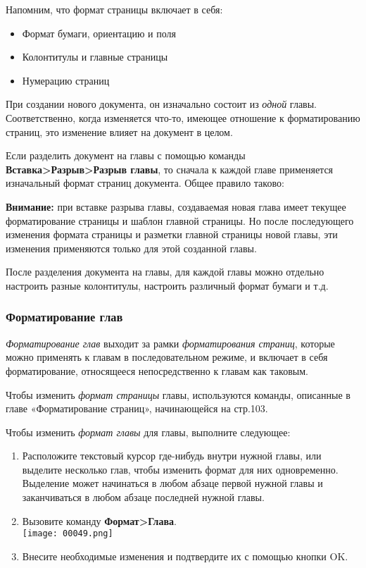 \documentclass[a4paper,10pt]{article}
\begin{document}
Напомним, что формат страницы включает в себя:
\begin{itemize}
 \item Формат бумаги, ориентацию и поля
 \item Колонтитулы и главные страницы
 \item Нумерацию страниц
\end{itemize}

При создании нового документа, он изначально состоит из \textit{одной} главы. Соответственно, когда изменяется что-то, имеющее отношение к форматированию страниц, это изменение влияет на документ в целом.

Если разделить документ на главы с помощью команды \textbf{Вставка>Разрыв>Разрыв главы}, то сначала к каждой главе применяется изначальный формат страниц документа. Общее правило таково:

\begin{mdframed}[backgroundcolor=blue!10]
\textbf{Внимание:} при вставке разрыва главы, создаваемая новая глава имеет текущее форматирование страницы и шаблон главной страницы. Но после последующего изменения формата страницы и разметки главной страницы новой главы, эти изменения применяются только для этой созданной главы.
\end{mdframed}

После разделения документа на главы, для каждой главы можно отдельно настроить разные колонтитулы, настроить различный формат бумаги и т.д.

\subsubsection{Форматирование глав}
\textit{Форматирование глав} выходит за рамки \textit{форматирования страниц}, которые можно применять к главам в последовательном режиме, и включает в себя форматирование, относящееся непосредственно к главам как таковым.

Чтобы изменить \textit{формат страницы} главы, используются команды, описанные в главе «Форматирование страниц», начинающейся на стр.103.

Чтобы изменить \textit{формат главы} для главы, выполните следующее:
\begin{enumerate}
 \item Расположите текстовый курсор где-нибудь внутри нужной главы, или выделите несколько глав, чтобы изменить формат для них одновременно. Выделение может начинаться в любом абзаце первой нужной главы и заканчиваться в любом абзаце последней нужной главы.
 \item Вызовите команду \textbf{Формат>Глава}.\\
 \texttt{[image: 00049.png]}
 \item Внесите необходимые изменения и подтвердите их с помощью кнопки OK.
\end{enumerate}
\end{document}
